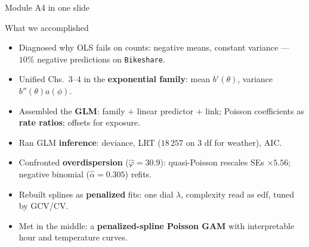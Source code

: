 \documentclass[aspectratio=169,11pt]{beamer}
\begin{document}
\begin{frame}{Module A4 in one slide}
  \begin{block}{What we accomplished}
    \begin{itemize}
      \item Diagnosed why OLS fails on counts: negative means, constant variance ---
            $10\%$ negative predictions on \texttt{Bikeshare}.
      \item Unified Chs.\ 3--4 in the \textbf{exponential family}: mean $b'(\theta)$,
            variance $b''(\theta) a(\phi)$.
      \item Assembled the \textbf{GLM}: family $+$ linear predictor $+$ link; Poisson
            coefficients as \textbf{rate ratios}; offsets for exposure.
      \item Ran GLM \textbf{inference}: deviance, LRT ($18\,257$ on $3$ df for weather),
            AIC.
      \item Confronted \textbf{overdispersion} ($\hat\varphi = 30.9$): quasi-Poisson
            rescales SEs $\times 5.56$; negative binomial ($\hat\alpha = 0.305$) refits.
      \item Rebuilt splines as \textbf{penalized} fits: one dial $\lambda$, complexity
            read as edf, tuned by GCV/CV.
      \item Met in the middle: a \textbf{penalized-spline Poisson GAM} with
            interpretable hour and temperature curves.
    \end{itemize}
  \end{block}
\end{frame}
\end{document}
